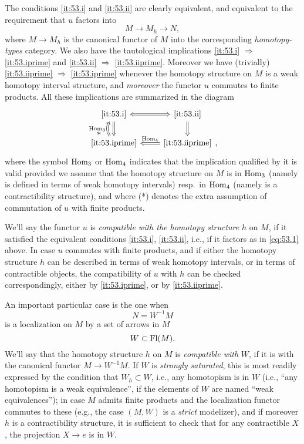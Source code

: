 The conditions \ref{it:53.i} and \ref{it:53.ii} are clearly
equivalent, and equivalent to the requirement that $u$ factors into
\begin{equation}
  \label{eq:53.1}
  M \to M_h \to N,\tag{1}
\end{equation}
where $M\to M_h$ is the canonical functor of $M$ into the
corresponding \emph{homotopy-types} category. We also have the
tautological implications \ref{it:53.i} $\Rightarrow$
\ref{it:53.iprime} and \ref{it:53.ii} $\Rightarrow$
\ref{it:53.iiprime}. Moreover we have (trivially) \ref{it:53.iiprime}
$\Rightarrow$ \ref{it:53.iprime} whenever the homotopy structure on
$M$ is a weak homotopy interval structure, and \emph{moreover} the
functor $u$ commutes to finite products. All these implications are
summarized in the diagram
\[\begin{tikzcd}[baseline=(O.base),math mode=false,%
  arrows=Rightarrow]
  \ref{it:53.i} \ar[r,Leftrightarrow]\ar[d] &
  \ref{it:53.ii} \ar[d] \\
  \ref{it:53.iprime} \ar[u,bend left,"*\;\;" pos=0.45, "$\Hom_3$"] &
  |[alias=O]| \ref{it:53.iiprime} \ar[l,swap,"$\Hom_4$"]
\end{tikzcd},\]
where the symbol $\operatorname{Hom}_3$ or $\operatorname{Hom}_4$ indicates that the implication
qualified by it is valid provided we assume that the homotopy
structure on $M$ is in $\operatorname{Hom}_3$ (namely is defined in terms of weak
homotopy intervals) resp.\ in $\operatorname{Hom}_4$ (namely is a contractibility
structure), and where (*) denotes the extra assumption of commutation
of $u$ with finite products.

We'll say the functor $u$ is \emph{compatible with the
  homotopy structure} $h$ on $M$, if it satisfied the equivalent
conditions \ref{it:53.i}, \ref{it:53.ii}, i.e., if it factors as in
\eqref{eq:53.1} above. In case $u$ commutes with finite products, and
if either the homotopy structure $h$ can be described in terms of weak
homotopy intervals, or in terms of contractible objects, the
compatibility of $u$ with $h$ can be checked correspondingly, either
by \ref{it:53.iprime}, or by \ref{it:53.iiprime}.

\clearpage

\label{sec:54}%
An important particular case is the one when
\[N = W^{-1}M\]
is a localization on $M$ by a set of arrows in $M$
\[W\subset \operatorname{Fl}(M).\]
We'll say that the homotopy structure $h$ on $M$ is \emph{compatible
  with} $W$, if it is with the canonical functor $M\to W^{-1}M$. If
$W$ is \emph{strongly saturated}, this is most readily expressed by
the condition that $W_h\subset W$, i.e., any homotopism is in $W$
(i.e., ``any homotopism is a weak equivalence'', if the elements of
$W$ are named ``weak equivalences''); in case $M$ admits finite
products and the localization functor commutes to these (e.g., the
case $(M,W)$ is a \emph{strict} modelizer), and if moreover $h$ is a
contractibility structure, it is sufficient to check that for any
contractible $X$, the projection $X\to e$ is in $W$.

